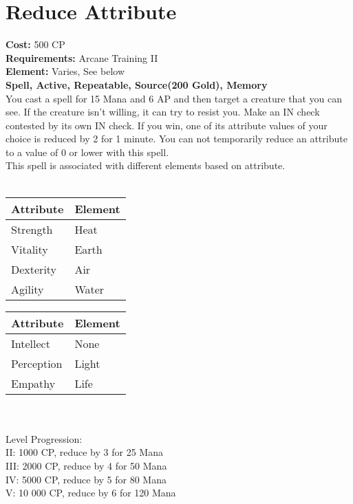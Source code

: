 \section{Reduce Attribute}
\textbf{Cost:} 500 CP\\
\textbf{Requirements:} Arcane Training II\\
\textbf{Element:} Varies, See below\\
\textbf{Spell, Active, Repeatable, Source(200 Gold), Memory}\\
You cast a spell for 15 Mana and 6 AP and then target a creature that you can see. If the creature isn’t willing, it can try to resist you. Make an IN check contested by its own IN check. If you win, one of its attribute values of your choice is reduced by 2 for 1 minute. You can not temporarily reduce an attribute to a value of 0 or lower with this spell. \\
This spell is associated with different elements based on attribute.\\
\\
\begin{minipage}{0.5\textwidth}
	\begin{tabular}{l | l} 
		Attribute & Element\\ \hline
		Strength & Heat\\
		Vitality & Earth\\
		Dexterity & Air\\
		Agility & Water\\
	\end{tabular}
\end{minipage}
\begin{minipage}{0.5\textwidth}
	\begin{tabular}{l | l}
		Attribute & Element\\ \hline
		Intellect & None\\
		Perception & Light\\
		Empathy & Life\\
	\end{tabular}
\end{minipage}
\\
\\
Level Progression:\\
II: 1000 CP, reduce by 3 for 25 Mana\\
III: 2000 CP, reduce by 4 for 50 Mana\\
IV: 5000 CP, reduce by 5 for 80 Mana\\
V: 10 000 CP, reduce by 6 for 120 Mana\\